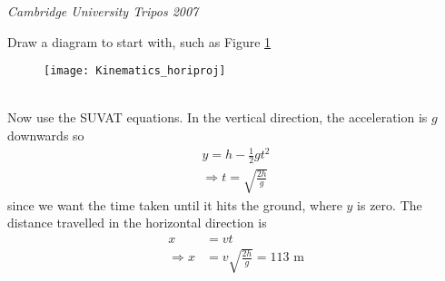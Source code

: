 
\begin{problem} %
{ 
\vspace{-0.3cm}
}
{\textit{Cambridge University Tripos 2007}}
{Draw a diagram to start with, such as Figure \ref{fig:Kinematics_horiproj}
\begin{figure}[h]
\centering
\texttt{[image: Kinematics\_horiproj]}
\caption{}
\label{fig:Kinematics_horiproj}
\end{figure}
\\
Now use the SUVAT equations. In the vertical direction, the acceleration is $g$ downwards so
\begin{align*}
y=h-\frac{1}{2}gt^2 \\
\Rightarrow t=\sqrt{\frac{2h}{g}}
\end{align*}
since we want the time taken until it hits the ground, where $y$ is zero. The distance travelled in the horizontal direction is 
\begin{align*}
x&=vt \\
\Rightarrow x&=v\sqrt{\frac{2h}{g}}=113\textrm{ m}
\end{align*}
}
\end{problem}
